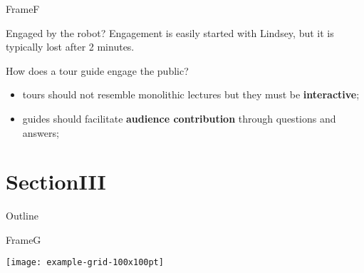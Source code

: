 \documentclass[english,svgnames,notes=hide,aspectratio=169,14pt]{beamer}
\begin{document}

\begin{frame}{FrameF}

   \begin{alertblock}{Engaged by the robot?}
      Engagement is easily started with Lindsey, but it is
      typically lost after 2 minutes.
   \end{alertblock}

   \begin{block}{How does a tour guide engage the public?}
      \begin{itemize}
         \item tours should not resemble monolithic lectures but they
               must be \textbf{interactive};
         \item guides should facilitate \textbf{audience contribution}
               through questions and answers;
      \end{itemize}
   \end{block}

\end{frame}


\section{SectionIII}


\begin{frame}{Outline}

   \tableofcontents[currentsection]

\end{frame}


\begin{frame}{FrameG}

   \begin{block}{}
      \tiny \lipsum[66]
   \end{block}

   \begin{center}
      \texttt{[image: example-grid-100x100pt]}
   \end{center}

\end{frame}
\end{document}
